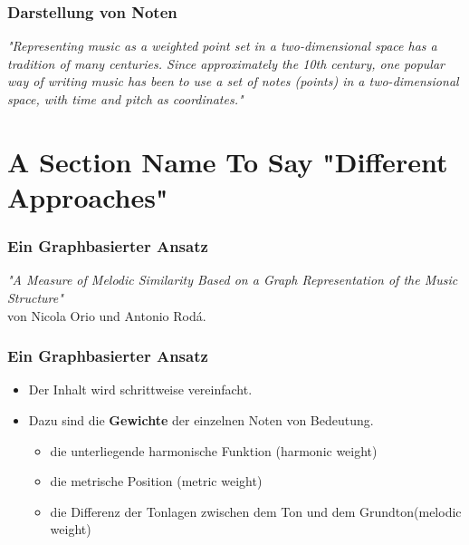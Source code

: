 \documentclass{beamer}
\begin{document}
	\begin{frame}
		\frametitle{Darstellung von Noten}
			\textit{"Representing music as a weighted point set in a two-dimensional space has a tradition of many centuries. Since approximately the 10th century, one popular way of writing music has been to use a set of notes (points) in a two-dimensional space, with time and pitch as coordinates."}\cite{three}
	\end{frame}

	\section{A Section Name To Say "Different Approaches"}

	\begin{frame}
		\frametitle{Ein Graphbasierter Ansatz}
		\begin{minipage}{0.45\textwidth}
			\begin{center}
				\textit{"A Measure of Melodic Similarity Based on a Graph Representation of the Music Structure"} 
				\cite{two_point_four}  \\ 
				von Nicola Orio und Antonio Rodá.
			\end{center}
		\end{minipage}%
		\begin{minipage}{0.45\textwidth}
			\begin{figure}[h!]
			\end{figure}
		\end{minipage}
	\end{frame}


	\begin{frame}
		\frametitle{Ein Graphbasierter Ansatz}
		\begin{itemize}
				\item Der Inhalt wird schrittweise vereinfacht.
				\item Dazu sind die \textbf{Gewichte} der einzelnen Noten von Bedeutung.
					\begin{itemize}
						\item die unterliegende harmonische Funktion (harmonic weight)
						\item die metrische Position (metric weight)
						\item die Differenz der Tonlagen zwischen dem Ton und dem Grundton(melodic weight)
					\end{itemize}
		\end{itemize}
	\end{frame}
\end{document}
